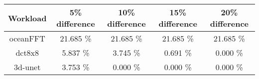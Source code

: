 \begin{tabular}{|c|c|c|c|c|}
\hline
  \textbf{Workload} & \textbf{5\% difference} & \textbf{10\% difference} & \textbf{15\% difference} & \textbf{20\% difference}\\
\hline
\hline
  oceanFFT & 21.685 \% & 21.685 \% & 21.685 \% & 21.685 \%\\
  dct8x8 & 5.837 \% & 3.745 \% & 0.691 \% & 0.000 \%\\
  3d-unet & 3.753 \% & 0.000 \% & 0.000 \% & 0.000 \%\\
\hline
\end{tabular}
